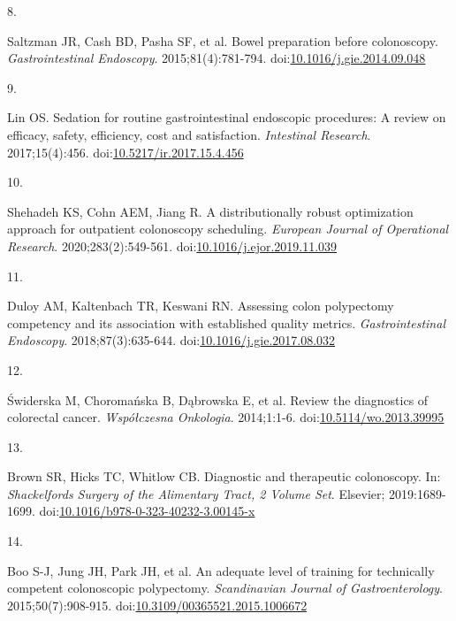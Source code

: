 \documentclass[11pt]{umnthesis}
\newlength{\csllabelwidth}
\newlength{\cslhangindent}
\newenvironment{CSLReferences}[2] %
 {%
  \setlength{\parindent}{0pt}
  \ifodd #1 \everypar{\setlength{\hangindent}{\cslhangindent}}\ignorespaces\fi
  \ifnum #2 > 0
  \setlength{\parskip}{#2\baselineskip}
  \fi
 }%
 {}
\newcommand{\CSLLeftMargin}[1]{\parbox[t]{\csllabelwidth}{#1}}
\newcommand{\CSLRightInline}[1]{\parbox[t]{\linewidth - \csllabelwidth}{#1}}
\begin{document}
\begin{CSLReferences}{0}{0}
\leavevmode{}%
\CSLLeftMargin{8. }
\CSLRightInline{Saltzman JR, Cash BD, Pasha SF, et al. Bowel preparation before colonoscopy. \emph{Gastrointestinal Endoscopy}. 2015;81(4):781-794. doi:\href{https://doi.org/10.1016/j.gie.2014.09.048}{10.1016/j.gie.2014.09.048}}

\leavevmode{}%
\CSLLeftMargin{9. }
\CSLRightInline{Lin OS. Sedation for routine gastrointestinal endoscopic procedures: A review on efficacy, safety, efficiency, cost and satisfaction. \emph{Intestinal Research}. 2017;15(4):456. doi:\href{https://doi.org/10.5217/ir.2017.15.4.456}{10.5217/ir.2017.15.4.456}}

\leavevmode{}%
\CSLLeftMargin{10. }
\CSLRightInline{Shehadeh KS, Cohn AEM, Jiang R. A distributionally robust optimization approach for outpatient colonoscopy scheduling. \emph{European Journal of Operational Research}. 2020;283(2):549-561. doi:\href{https://doi.org/10.1016/j.ejor.2019.11.039}{10.1016/j.ejor.2019.11.039}}

\leavevmode{}%
\CSLLeftMargin{11. }
\CSLRightInline{Duloy AM, Kaltenbach TR, Keswani RN. Assessing colon polypectomy competency and its association with established quality metrics. \emph{Gastrointestinal Endoscopy}. 2018;87(3):635-644. doi:\href{https://doi.org/10.1016/j.gie.2017.08.032}{10.1016/j.gie.2017.08.032}}

\leavevmode{}%
\CSLLeftMargin{12. }
\CSLRightInline{Świderska M, Choromańska B, Dąbrowska E, et al. Review the diagnostics of colorectal cancer. \emph{Wsp{ó}{ł}czesna Onkologia}. 2014;1:1-6. doi:\href{https://doi.org/10.5114/wo.2013.39995}{10.5114/wo.2013.39995}}

\leavevmode{}%
\CSLLeftMargin{13. }
\CSLRightInline{Brown SR, Hicks TC, Whitlow CB. Diagnostic and therapeutic colonoscopy. In: \emph{Shackelford{\textquotesingle}s Surgery of the Alimentary Tract, 2 Volume Set}. Elsevier; 2019:1689-1699. doi:\href{https://doi.org/10.1016/b978-0-323-40232-3.00145-x}{10.1016/b978-0-323-40232-3.00145-x}}

\leavevmode{}%
\CSLLeftMargin{14. }
\CSLRightInline{Boo S-J, Jung JH, Park JH, et al. An adequate level of training for technically competent colonoscopic polypectomy. \emph{Scandinavian Journal of Gastroenterology}. 2015;50(7):908-915. doi:\href{https://doi.org/10.3109/00365521.2015.1006672}{10.3109/00365521.2015.1006672}}


\end{CSLReferences}
\end{document}
